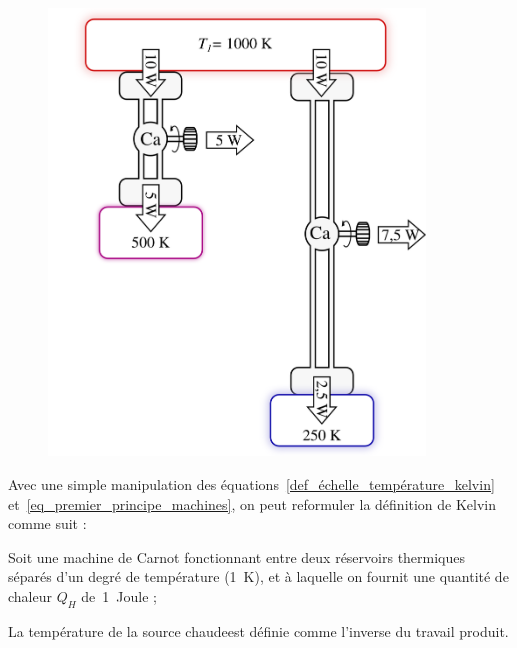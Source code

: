 		\begin{figure}
			\begin{center}
				\includegraphics[width=10cm]{images/echelle_temperature_kelvin.png}
			\end{center}
			\label{fig_échelle_température_kelvin}
		\end{figure}

		Avec une simple manipulation des équations~\ref{def_échelle_température_kelvin} et~\ref{eq_premier_principe_machines}, on peut reformuler la définition de Kelvin comme suit :

		\begin{trucimportant}
			Soit une machine de Carnot fonctionnant 
			entre deux réservoirs thermiques séparés d’un degré de température (\SI{1}{\kelvin}),\linebreak
			et à laquelle on fournit une quantité de chaleur $Q_{H}$ de~\SI{1}{Joule} ;

			La température de la source chaude\linebreak est définie comme l’inverse du travail produit.
		\end{trucimportant}

